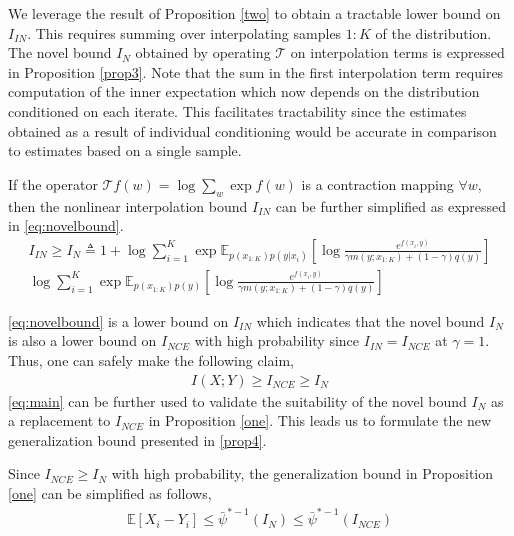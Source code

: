 \documentclass{article}
\begin{document}
We leverage the result of Proposition \autoref{two} to obtain a tractable lower bound on $I_{IN}$. This requires summing over interpolating samples $1:K$ of the distribution. The novel bound $I_{N}$ obtained by operating $\mathcal{T}$ on interpolation terms is expressed in Proposition \autoref{prop3}. Note that the sum in the first interpolation term requires computation of the inner expectation which now depends on the distribution conditioned on each iterate. This facilitates tractability since the estimates obtained as a result of individual conditioning would be accurate in comparison to estimates based on a single sample. 
\begin{customthm}{3}\label{prop3}
  If the operator $\mathcal{T}f(w)=\log \sum_{w} \exp{f(w)}$ is a contraction mapping $\forall w$, then the nonlinear interpolation bound $I_{IN}$ can be further simplified as expressed in \autoref{eq:novelbound}. 
\begin{multline}  
  I_{IN} \geq I_{N} \triangleq 1 + \log \sum_{i=1}^{K} \exp{\mathbb{E}_{p(x_{1:K})p(y|x_{i})}[\log\frac{e^{f(x_{i},y)}}{\gamma m(y;x_{1:K})+(1-\gamma)q(y)}]}\\ \log \sum_{i=1}^{K} \exp{\mathbb{E}_{p(x_{1:K})p(y)}[\log\frac{e^{f(x_{i},y)}}{\gamma m(y;x_{1:K})+(1-\gamma)q(y)}]} \label{eq:novelbound}
\end{multline} 
\label{novelbound} 
\end{customthm}
\autoref{eq:novelbound} is a lower bound on $I_{IN}$ which indicates that the novel bound $I_{N}$ is also a lower bound on $I_{NCE}$ with high probability since $I_{IN} = I_{NCE}$ at $\gamma=1$. Thus, one can safely make the following claim,
\begin{gather}
  I(X;Y) \geq I_{NCE} \geq I_{N} \label{eq:main}
\end{gather}
\autoref{eq:main} can be further used to validate the suitability of the novel bound $I_{N}$ as a replacement to $I_{NCE}$ in Proposition \autoref{one}. This leads us to formulate the new generalization bound presented in \autoref{prop4}.
\begin{customthm}{4}\label{prop4}
  Since $I_{NCE} \geq I_{N}$ with high probability, the generalization bound in Proposition \autoref{one} can be simplified as follows,
  \begin{gather}
    \mathbb{E}[X_{i} - Y_{i}] \leq \bar{\psi}^{*-1}(I_{N}) \leq \bar{\psi}^{*-1}(I_{NCE})
  \end{gather} 
\end{customthm}
\end{document}
